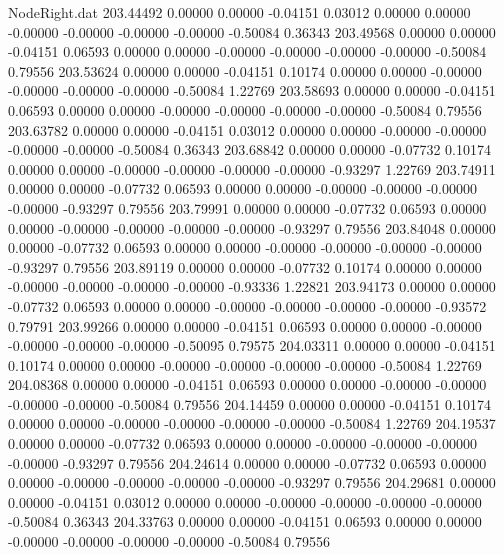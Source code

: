 \begin{filecontents}{NodeRight.dat}
 203.44492    0.00000    0.00000    -0.04151    0.03012    0.00000    0.00000   -0.00000   -0.00000   -0.00000   -0.00000   -0.50084    0.36343
 203.49568    0.00000    0.00000    -0.04151    0.06593    0.00000    0.00000   -0.00000   -0.00000   -0.00000   -0.00000   -0.50084    0.79556
 203.53624    0.00000    0.00000    -0.04151    0.10174    0.00000    0.00000   -0.00000   -0.00000   -0.00000   -0.00000   -0.50084    1.22769
 203.58693    0.00000    0.00000    -0.04151    0.06593    0.00000    0.00000   -0.00000   -0.00000   -0.00000   -0.00000   -0.50084    0.79556
 203.63782    0.00000    0.00000    -0.04151    0.03012    0.00000    0.00000   -0.00000   -0.00000   -0.00000   -0.00000   -0.50084    0.36343
 203.68842    0.00000    0.00000    -0.07732    0.10174    0.00000    0.00000   -0.00000   -0.00000   -0.00000   -0.00000   -0.93297    1.22769
 203.74911    0.00000    0.00000    -0.07732    0.06593    0.00000    0.00000   -0.00000   -0.00000   -0.00000   -0.00000   -0.93297    0.79556
 203.79991    0.00000    0.00000    -0.07732    0.06593    0.00000    0.00000   -0.00000   -0.00000   -0.00000   -0.00000   -0.93297    0.79556
 203.84048    0.00000    0.00000    -0.07732    0.06593    0.00000    0.00000   -0.00000   -0.00000   -0.00000   -0.00000   -0.93297    0.79556
 203.89119    0.00000    0.00000    -0.07732    0.10174    0.00000    0.00000   -0.00000   -0.00000   -0.00000   -0.00000   -0.93336    1.22821
 203.94173    0.00000    0.00000    -0.07732    0.06593    0.00000    0.00000   -0.00000   -0.00000   -0.00000   -0.00000   -0.93572    0.79791
 203.99266    0.00000    0.00000    -0.04151    0.06593    0.00000    0.00000   -0.00000   -0.00000   -0.00000   -0.00000   -0.50095    0.79575
 204.03311    0.00000    0.00000    -0.04151    0.10174    0.00000    0.00000   -0.00000   -0.00000   -0.00000   -0.00000   -0.50084    1.22769
 204.08368    0.00000    0.00000    -0.04151    0.06593    0.00000    0.00000   -0.00000   -0.00000   -0.00000   -0.00000   -0.50084    0.79556
 204.14459    0.00000    0.00000    -0.04151    0.10174    0.00000    0.00000   -0.00000   -0.00000   -0.00000   -0.00000   -0.50084    1.22769
 204.19537    0.00000    0.00000    -0.07732    0.06593    0.00000    0.00000   -0.00000   -0.00000   -0.00000   -0.00000   -0.93297    0.79556
 204.24614    0.00000    0.00000    -0.07732    0.06593    0.00000    0.00000   -0.00000   -0.00000   -0.00000   -0.00000   -0.93297    0.79556
 204.29681    0.00000    0.00000    -0.04151    0.03012    0.00000    0.00000   -0.00000   -0.00000   -0.00000   -0.00000   -0.50084    0.36343
 204.33763    0.00000    0.00000    -0.04151    0.06593    0.00000    0.00000   -0.00000   -0.00000   -0.00000   -0.00000   -0.50084    0.79556

\end{filecontents}
